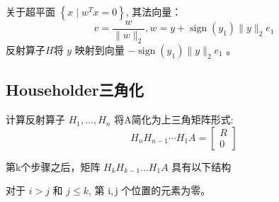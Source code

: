 关于超平面 $ \left\{x \mid w^{T} x=0\right\} $, 其法向量：
$$
v=\frac{w}{\|w\|_{2}}, w=y+\operatorname{sign}\left(y_{1}\right)\|y\|_{2} e_{1}
$$
反射算子$H$将 $ y $ 映射到向量 $ -\operatorname{sign}\left(y_{1}\right)\|y\|_{2} e_{1} $ 。

\subsection{Householder三角化}

计算反射算子 $ H_{1}, \ldots, H_{n} $ 将A简化为上三角矩阵形式:
$$
H_{n} H_{n-1} \cdots H_{1} A=\left[\begin{array}{l}
R \\
0
\end{array}\right]
$$

第k个步骤之后，矩阵 $ H_{k} H_{k-1} \ldots H_{1} A $ 具有以下结构

对于 $ i>j $ 和 $ j \leq k $, 第 $ \mathrm{i}, \mathrm{j} $ 个位置的元素为零。

